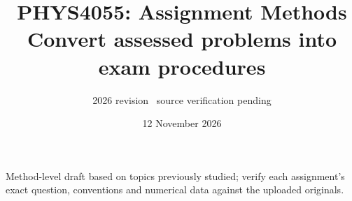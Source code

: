 \documentclass[10pt,a4paper]{article}
\title{\textcolor{accent}{PHYS4055: Assignment Methods}\\[2mm]\large Convert assessed problems into exam procedures}
\author{2026 revision \textbar\ source verification pending}
\date{12 November 2026}
\begin{document}
\maketitle
\begin{cautionbox}
Method-level draft based on topics previously studied; verify each assignment's
exact question, conventions and numerical data against the uploaded originals.
\end{cautionbox}
\tableofcontents
\clearpage



\end{document}
